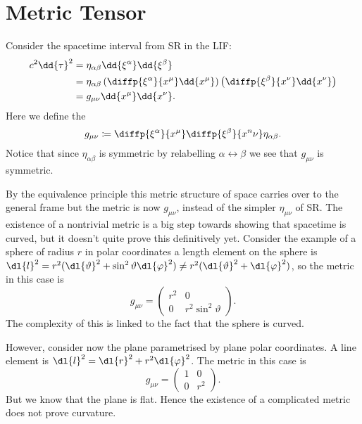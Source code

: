 \documentclass[fleqn]{NotesClass}
\begin{document}
    \section{Metric Tensor}
    Consider the spacetime interval from SR in the LIF:
    \begin{align}
        c^2\dd{\tau}^2 &= \eta_{\alpha\beta}\dd{\xi^\alpha}\dd{\xi^\beta}\\
        &= \eta_{\alpha\beta}\left( \diffp{\xi^\alpha}{x^\mu}\dd{x^\mu} \right)\left( \diffp{\xi^\beta}{x^\nu}\dd{x^\nu} \right)\\
        &= g_{\mu\nu}\dd{x^\mu}\dd{x^\nu}.
    \end{align}
    Here we define the 
    \begin{equation}\label{eqn:metric tensor}
        g_{\mu\nu} \coloneqq \diffp{\xi^\alpha}{x^\mu}\diffp{\xi^\beta}{x^n\nu}\eta_{\alpha\beta}.
    \end{equation}
    Notice that since \(\eta_{\alpha\beta}\) is symmetric by relabelling \(\alpha \leftrightarrow \beta\) we see that \(g_{\mu\nu}\) is symmetric.
    
    By the equivalence principle this metric structure of space carries over to the general frame but the metric is now \(g_{\mu\nu}\), instead of the simpler \(\eta_{\mu\nu}\) of SR.
    The existence of a nontrivial metric is a big step towards showing that spacetime is curved, but it doesn't quite prove this definitively yet.
    Consider the example of a sphere of radius \(r\) in polar coordinates a length element on the sphere is \(\dl{l}^2 = r^2(\dl{\vartheta}^2 + \sin^2\vartheta\dl{\varphi}^2) \ne r^2(\dl{\vartheta}^2 + \dl{\varphi}^2)\), so the metric in this case is
    \begin{equation}
        g_{\mu\nu} = 
        \begin{pmatrix}
            r^2 & 0\\
            0 & r^2\sin^2\vartheta
        \end{pmatrix}
        .
    \end{equation}
    The complexity of this is linked to the fact that the sphere is curved.
    
    However, consider now the plane parametrised by plane polar coordinates.
    A line element is \(\dl{l}^2 = \dl{r}^2 + r^2\dl{\varphi}^2\).
    The metric in this case is
    \begin{equation}
        g_{\mu\nu} = 
        \begin{pmatrix}
            1 & 0\\
            0 & r^2
        \end{pmatrix}
        .
    \end{equation}
    But we know that the plane is flat.
    Hence the existence of a complicated metric does not prove curvature.
    
\end{document}
